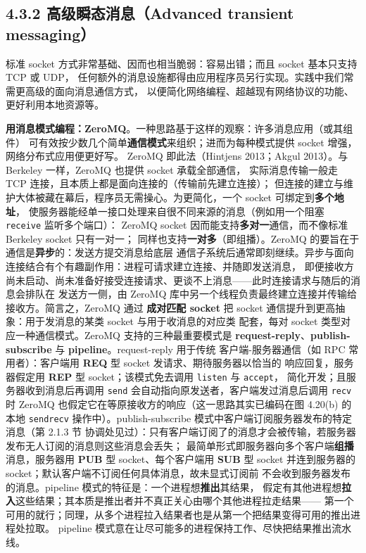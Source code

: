 
\subsection*{4.3.2 高级瞬态消息（Advanced transient messaging）}
标准 socket 方式非常基础、因而也相当脆弱：容易出错；而且 socket 基本只支持 TCP 或 UDP，
任何额外的消息设施都得由应用程序员另行实现。实践中我们常需更高级的面向消息通信方式，
以便简化网络编程、超越现有网络协议的功能、更好利用本地资源等。

\medskip\noindent\textbf{用消息模式编程：ZeroMQ}。一种思路基于这样的观察：许多消息应用（或其组件）
可有效按少数几个简单\textbf{通信模式}来组织；进而为每种模式提供 socket 增强，网络分布式应用便更好写。
ZeroMQ 即此法（Hintjens 2013；Akgul 2013）。与 Berkeley 一样，ZeroMQ 也提供 socket 承载全部通信，
实际消息传输一般走 TCP 连接，且本质上都是面向连接的（传输前先建立连接）；
但连接的建立与维护大体被藏在幕后，程序员无需操心。为更简化，一个 socket 可绑定到\textbf{多个地址}，
使服务器能经单一接口处理来自很不同来源的消息（例如用一个阻塞 \texttt{receive} 监听多个端口）：
ZeroMQ socket 因而能支持\textbf{多对一}通信，而不像标准 Berkeley socket 只有一对一；
同样也支持\textbf{一对多}（即组播）。ZeroMQ 的要旨在于通信是\textbf{异步}的：发送方提交消息给底层
通信子系统后通常即刻继续。异步与面向连接结合有个有趣副作用：进程可请求建立连接、并随即发送消息，
即便接收方尚未启动、尚未准备好接受连接请求、更谈不上消息——此时连接请求与随后的消息会排队在
发送方一侧，由 ZeroMQ 库中另一个线程负责最终建立连接并传输给接收方。简言之，ZeroMQ 通过
\textbf{成对匹配 socket} 把 socket 通信提升到更高抽象：用于发消息的某类 socket 与用于收消息的对应类
配套，每对 socket 类型对应一种通信模式。ZeroMQ 支持的三种最重要模式是
\textbf{request-reply}、\textbf{publish-subscribe} 与 \textbf{pipeline}。request-reply 用于传统
客户端-服务器通信（如 RPC 常用者）：客户端用 \textbf{REQ} 型 socket 发请求、期待服务器以恰当的
响应回复，服务器假定用 \textbf{REP} 型 socket；该模式免去调用 \texttt{listen} 与 \texttt{accept}，
简化开发；且服务器收到消息后再调用 \texttt{send} 会自动指向原发送者，客户端发过消息后调用
\texttt{recv} 时 ZeroMQ 也假定它在等原接收方的响应（这一思路其实已编码在图 4.20(b) 的本地
\texttt{sendrecv} 操作中）。publish-subscribe 模式中客户端订阅服务器发布的特定消息（第 2.1.3 节
协调处见过）：只有客户端订阅了的消息才会被传输，若服务器发布无人订阅的消息则这些消息会丢失；
最简单形式即服务器向多个客户端\textbf{组播}消息，服务器用 \textbf{PUB} 型 socket、每个客户端用
\textbf{SUB} 型 socket 并连到服务器的 socket；默认客户端不订阅任何具体消息，故未显式订阅前
不会收到服务器发布的消息。pipeline 模式的特征是：一个进程想\textbf{推出}其结果，
假定有其他进程想\textbf{拉入}这些结果；其本质是推出者并不真正关心由哪个其他进程拉走结果——
第一个可用的就行；同理，从多个进程拉入结果者也是从第一个把结果变得可用的推出进程处拉取。
pipeline 模式意在让尽可能多的进程保持工作、尽快把结果推出流水线。

